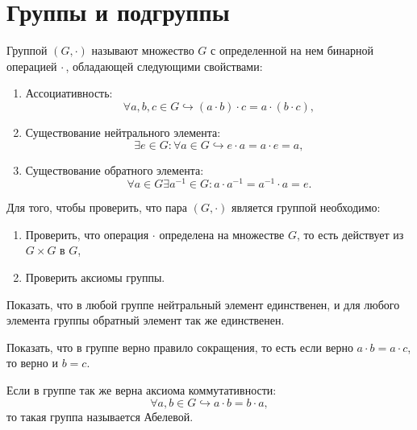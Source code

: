 
\section{Группы и подгруппы}

\begin{definition}
    Группой $\left(G, \cdot\right)$ называют множество $G$ с определенной на нем бинарной операцией 
    $\cdot\,$, обладающей следующими свойствами:
    \begin{enumerate}
        \item Ассоциативность: 
        $$\forall a,b,c \in G \hookrightarrow \left(a \cdot b\right) \cdot c = a \cdot \left(b \cdot c\right),$$
        \item Существование нейтрального элемента: 
        $$\exists e \in G: \forall a \in G \hookrightarrow e \cdot a = a \cdot e = a,$$
        \item Существование обратного элемента: 
        $$\forall a \in G \exists a^{-1} \in G: a \cdot a^{-1} = a^{-1} \cdot a = e.$$
    \end{enumerate}
\end{definition}

\begin{note}
    Для того, чтобы проверить, что пара $\left(G, \cdot\right)$ является группой необходимо:
    \begin{enumerate}
        \item Проверить, что операция $\cdot$ определена на множестве $G$, то есть действует из 
        $G \times G$ в $G$,
        \item Проверить аксиомы группы.
    \end{enumerate}
\end{note}

\begin{exercise}
    Показать, что в любой группе нейтральный элемент единственен, и для любого элемента группы 
    обратный элемент так же единственен.
\end{exercise}

\begin{exercise}
    Показать, что в группе верно правило сокращения, то есть если верно $a \cdot b = a \cdot c$, то верно и
    $b = c$.
\end{exercise}

\begin{note}
    Если в группе так же верна аксиома коммутативности:
    $$\forall a, b \in G \hookrightarrow a \cdot b = b \cdot a,$$
    то такая группа называется Абелевой.
\end{note}

